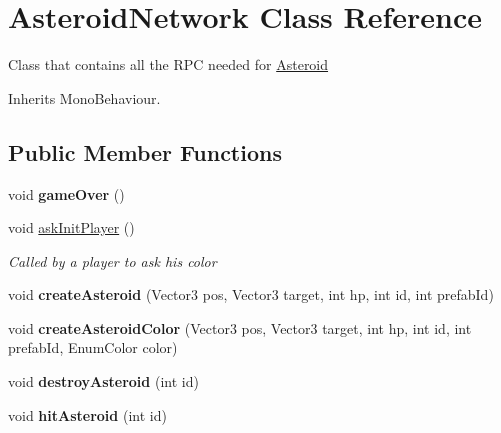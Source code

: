 \hypertarget{class_asteroid_network}{\section{Asteroid\-Network Class Reference}
\label{class_asteroid_network}
}


Class that contains all the R\-P\-C needed for \hyperlink{class_asteroid}{Asteroid}  




Inherits Mono\-Behaviour.

\subsection*{Public Member Functions}
\begin{DoxyCompactItemize}
\item 
\hypertarget{class_asteroid_network_a5175fb92924d8a38a2cbfe3e6f645028}{void {\bfseries game\-Over} ()}\label{class_asteroid_network_a5175fb92924d8a38a2cbfe3e6f645028}

\item 
void \hyperlink{class_asteroid_network_a81680a1ea0bf0e606b10ed348156bbc8}{ask\-Init\-Player} ()
\begin{DoxyCompactList}\small\item\em Called by a player to ask his color \end{DoxyCompactList}\item 
\hypertarget{class_asteroid_network_ac7235c93ef7d02f74d7034c0b914a648}{void {\bfseries create\-Asteroid} (Vector3 pos, Vector3 target, int hp, int id, int prefab\-Id)}\label{class_asteroid_network_ac7235c93ef7d02f74d7034c0b914a648}

\item 
\hypertarget{class_asteroid_network_ab957b92871eb1ea2f5e97ce7798d514c}{void {\bfseries create\-Asteroid\-Color} (Vector3 pos, Vector3 target, int hp, int id, int prefab\-Id, Enum\-Color color)}\label{class_asteroid_network_ab957b92871eb1ea2f5e97ce7798d514c}

\item 
\hypertarget{class_asteroid_network_ae6016e269d3e1f0d96dcabe12eab3b86}{void {\bfseries destroy\-Asteroid} (int id)}\label{class_asteroid_network_ae6016e269d3e1f0d96dcabe12eab3b86}

\item 
\hypertarget{class_asteroid_network_a48ce64796b075ce41ab38f9dad0ca626}{void {\bfseries hit\-Asteroid} (int id)}\label{class_asteroid_network_a48ce64796b075ce41ab38f9dad0ca626}


\end{DoxyCompactItemize}
